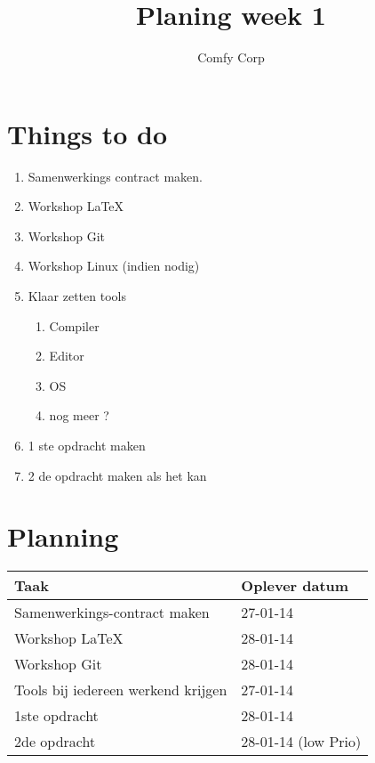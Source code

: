 \documentclass{article}
\begin{document}
\title{Planing week 1}
\author{Comfy Corp}

\maketitle

\section{Things to do}
\begin{enumerate}
\item{Samenwerkings contract maken.}
\item{Workshop \LaTeX}
\item{Workshop Git}
\item{Workshop Linux (indien nodig)}
\item{Klaar zetten tools
\begin{enumerate}
\item{Compiler}
\item{Editor}
\item{OS}
\item{nog meer ?}
\end{enumerate}}
\item{1 ste opdracht maken}
\item{2 de opdracht maken als het kan}
\end{enumerate}

\section{Planning}
\begin{table}
    \begin{tabular}{|l|l|}
    \hline
    Taak                         & Oplever datum \\ \hline
    Samenwerkings-contract maken & 27-01-14  \\ \hline
    Workshop \LaTeX     & 28-01-14      \\ \hline
    Workshop Git                 & 28-01-14      \\ \hline
    Tools bij iedereen werkend krijgen & 27-01-14  \\ \hline
    1ste opdracht                & 28-01-14             \\ \hline
    2de opdracht                 & 28-01-14 (low Prio)             \\ \hline
    \end{tabular}
\end{table}
\end{document}
